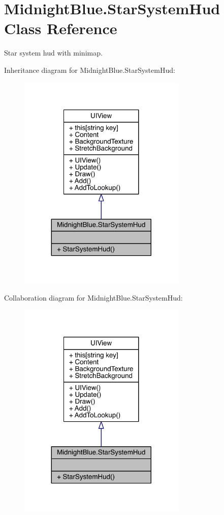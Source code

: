 \hypertarget{class_midnight_blue_1_1_star_system_hud}{}\section{Midnight\+Blue.\+Star\+System\+Hud Class Reference}
\label{class_midnight_blue_1_1_star_system_hud}


Star system hud with minimap.  




Inheritance diagram for Midnight\+Blue.\+Star\+System\+Hud\+:
\nopagebreak
\begin{figure}[H]
\begin{center}
\leavevmode
\includegraphics[width=227pt]{class_midnight_blue_1_1_star_system_hud__inherit__graph}
\end{center}
\end{figure}


Collaboration diagram for Midnight\+Blue.\+Star\+System\+Hud\+:
\nopagebreak
\begin{figure}[H]
\begin{center}
\leavevmode
\includegraphics[width=227pt]{class_midnight_blue_1_1_star_system_hud__coll__graph}
\end{center}
\end{figure}
